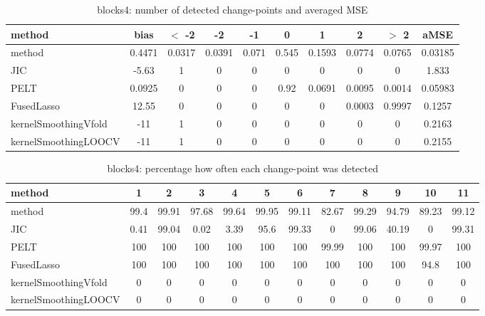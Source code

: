 \begin{table}[ht]
\centering
\begin{tabular}{l|c|ccccccc|c}
  \hline
method & bias & $<$ -2 & -2 & -1 & 0 & 1 & 2 & $>$ 2 & aMSE \\ 
  \hline
method & 0.4471 & 0.0317 & 0.0391 & 0.071 & 0.545 & 0.1593 & 0.0774 & 0.0765 & 0.03185 \\ 
  JIC & -5.63 &     1 &     0 &     0 &     0 &     0 &     0 &     0 & 1.833 \\ 
  PELT & 0.0925 &     0 &     0 &     0 &  0.92 & 0.0691 & 0.0095 & 0.0014 & 0.05983 \\ 
  FusedLasso & 12.55 &     0 &     0 &     0 &     0 &     0 & 0.0003 & 0.9997 & 0.1257 \\ 
  kernelSmoothingVfold &   -11 &     1 &     0 &     0 &     0 &     0 &     0 &     0 & 0.2163 \\ 
  kernelSmoothingLOOCV &   -11 &     1 &     0 &     0 &     0 &     0 &     0 &     0 & 0.2155 \\ 
   \hline
\end{tabular}
\caption{blocks4: number of detected change-points and averaged MSE} 
\label{tab:blocks4Njumps}
\end{table}
\begin{table}[ht]
\centering
\begin{tabular}{l|ccccccccccc}
  \hline
method & 1 & 2 & 3 & 4 & 5 & 6 & 7 & 8 & 9 & 10 & 11 \\ 
  \hline
method &   99.4 &  99.91 &  97.68 &  99.64 &  99.95 &  99.11 &  82.67 &  99.29 &  94.79 &  89.23 &  99.12 \\ 
  JIC &   0.41 &  99.04 &   0.02 &   3.39 &   95.6 &  99.33 &      0 &  99.06 &  40.19 &      0 &  99.31 \\ 
  PELT &    100 &    100 &    100 &    100 &    100 &    100 &  99.99 &    100 &    100 &  99.97 &    100 \\ 
  FusedLasso &    100 &    100 &    100 &    100 &    100 &    100 &    100 &    100 &    100 &   94.8 &    100 \\ 
  kernelSmoothingVfold &      0 &      0 &      0 &      0 &      0 &      0 &      0 &      0 &      0 &      0 &      0 \\ 
  kernelSmoothingLOOCV &      0 &      0 &      0 &      0 &      0 &      0 &      0 &      0 &      0 &      0 &      0 \\ 
   \hline
\end{tabular}
\caption{blocks4: percentage how often each change-point was detected} 
\label{tab:blocks4Detections}
\end{table}
